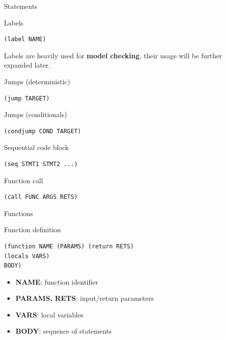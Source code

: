 \documentclass[aspectratio=1610,10.5pt]{beamer} %
\begin{document}
\begin{frame}[fragile]{Statements}
    \begin{block}{Labels}
            \begin{verbatim}
(label NAME)
            \end{verbatim}
        Labels are heavily used for \textbf{model checking}, their usage will be further expanded later.
    \end{block}
    \begin{block}{Jumps (deterministic)}
            \begin{verbatim}
(jump TARGET)
            \end{verbatim}
    \end{block}
    \begin{block}{Jumps (conditionals)}
            \begin{verbatim}
(condjump COND TARGET)
            \end{verbatim}
    \end{block}
    \begin{block}{Sequential code block}
            \begin{verbatim}
(seq STMT1 STMT2 ...)
            \end{verbatim}
    \end{block}
    \begin{block}{Function call}
            \begin{verbatim}
(call FUNC ARGS RETS)
            \end{verbatim}
    \end{block}
\end{frame}

\begin{frame}[fragile]{Functions}
    \begin{block}{Function definition}
            \begin{verbatim}
(function NAME (PARAMS) (return RETS)
(locals VARS)
BODY)
            \end{verbatim}
    \end{block}
    \begin{itemize}
        \item  \textbf{NAME}: function identifier
        \item  \textbf{PARAMS, RETS}: input/return parameters
        \item  \textbf{VARS}: local variables
        \item  \textbf{BODY}: sequence of statements
    \end{itemize}
\end{frame}
\end{document}
